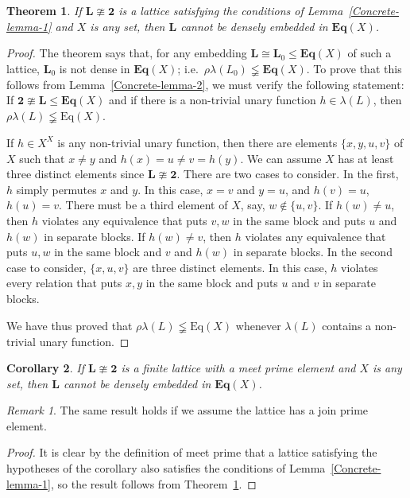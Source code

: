 \documentclass[cm,dissertation,actual,final]{uhthesis}
\theoremstyle{plain}
\newtheorem{theorem}{Theorem}[section]
\newtheorem{corollary}[theorem]{Corollary}
\theoremstyle{definition}
\theoremstyle{remark}
\newtheorem*{remark}{Remark}
\numberwithin{theorem}{section}
\numberwithin{claim}{chapter}
\numberwithin{equation}{section}
\numberwithin{conjecture}{chapter}
\newcommand{\<}{\ensuremath{\langle}}
\renewcommand{\>}{\ensuremath{\rangle}}
\renewcommand{\leq}{\ensuremath{\leqslant}}
\newcommand{\EqX}{\ensuremath{\mbox{Eq}(X)}}
\newcommand{\bEqX}{\ensuremath{\mathbf{Eq}(X)}}
\newcommand{\0}{\ensuremath{\mathbf{0}}}
\newcommand{\1}{\ensuremath{\mathbf{1}}}
\newcommand{\2}{\ensuremath{\mathbf{2}}}
\newcommand{\3}{\ensuremath{\mathbf{3}}}
\newcommand{\4}{\ensuremath{\mathbf{4}}}
\newcommand{\5}{\ensuremath{\mathbf{5}}}
\newcommand{\bL}{\ensuremath{\mathbf{L}}}
\begin{document}
\begin{theorem}\label{Concrete-thm-1} If $\bL\ncong \mathbf{2}$ is a lattice satisfying the conditions of Lemma~\ref{Concrete-lemma-1}
  and $X$ is any set, then $\bL$ cannot be densely embedded in $\bEqX$.
\end{theorem}
\begin{proof}
The theorem says that, for any embedding $\bL\cong \bL_0 \leq \bEqX$ of
such a lattice, $\bL_0$ is not dense in $\bEqX$; 
i.e.~$\rho \lambda(L_0) \lneqq  \bEqX$.  
To prove that this follows from Lemma~\ref{Concrete-lemma-2}, we must verify 
the following statement: If $\mathbf{2} \ncong \bL \leq \bEqX$
and if there is a non-trivial unary function $h\in \lambda(L)$, then 
$\rho \lambda(L) \lneqq \EqX$.

If $h\in X^X$ is any non-trivial unary function, then there are elements 
$\{x, y, u, v\}$ of $X$ such that $x\neq y$ and $h(x) = u \neq v = h(y)$.
We can assume $X$ has at least three distinct elements since $\bL \ncong \mathbf{2}$.
There are two cases to consider.  In the first, $h$ simply permutes $x$ and $y$.
In this case, $x=v$ and $y=u$, and $h(v) = u$, $h(u)=v$. There must be a third
element of $X$, say, $w\notin \{u,v\}$.  
If $h(w) \neq u$, then $h$ violates any equivalence that puts $v, w$ in the same
block and puts $u$ and $h(w)$ in separate blocks. 
If $h(w) \neq v$, then $h$ violates any equivalence that puts $u, w$ in the same
block and $v$ and $h(w)$ in separate blocks. 
In the second case to consider, $\{x, u, v\}$ are three distinct elements. In
this case, $h$ violates every relation that puts $x, y$ in the same block and puts
$u$ and $v$ in separate blocks. 

We have thus proved that $\rho \lambda(L) \lneqq \EqX$ whenever $\lambda(L)$ contains
a non-trivial unary function.
\end{proof}

\begin{corollary}\label{Concrete-cor-2}
If $\bL\ncong \mathbf{2}$ is a finite lattice with a meet prime element and $X$ is any set, then $\bL$ cannot
be densely embedded in $\bEqX$.
\end{corollary}
\begin{remark}
  The same result holds if we assume the lattice has a join prime element.
\end{remark}
\begin{proof}
It is clear by the definition of meet prime that a lattice 
satisfying the hypotheses of the corollary also satisfies the conditions
of Lemma~\ref{Concrete-lemma-1}, so the result follows from
Theorem~\ref{Concrete-thm-1}. 
\end{proof}
\end{document}
